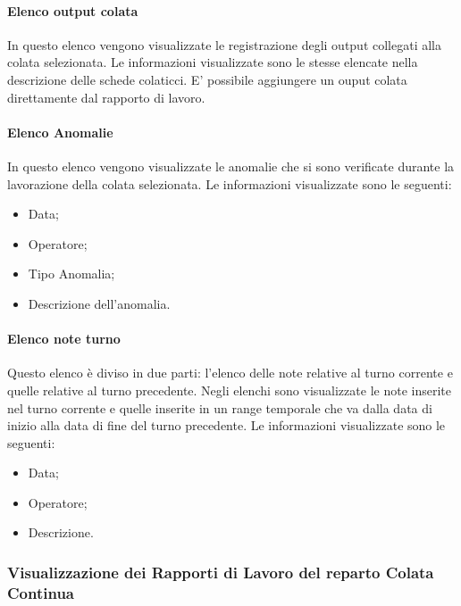   \paragraph{Elenco output colata}
  In questo elenco vengono visualizzate le registrazione degli output collegati alla colata selezionata. 
  Le informazioni visualizzate sono le stesse elencate 
  nella descrizione delle schede colaticci. E' possibile aggiungere un ouput colata direttamente dal 
  rapporto di lavoro.
  
  \paragraph{Elenco Anomalie}
  In questo elenco vengono visualizzate le anomalie che si sono verificate durante la lavorazione della colata 
  selezionata. Le informazioni visualizzate sono le seguenti:
  \begin{itemize}
    \item Data;
    \item Operatore;
    \item Tipo Anomalia;
    \item Descrizione dell'anomalia.
  \end{itemize} 
  
  \paragraph{Elenco note turno}
  Questo elenco è diviso in due parti: l'elenco delle note relative al turno corrente e quelle relative al 
  turno precedente. Negli elenchi sono visualizzate le note inserite nel turno corrente e quelle inserite 
  in un range temporale che va dalla data di inizio alla data di fine del turno precedente. 
  Le informazioni visualizzate sono le seguenti:
  \begin{itemize}
    \item Data;
    \item Operatore;
    \item Descrizione.
  \end{itemize}   

  \subsubsection{Visualizzazione dei Rapporti di Lavoro del reparto Colata Continua}
